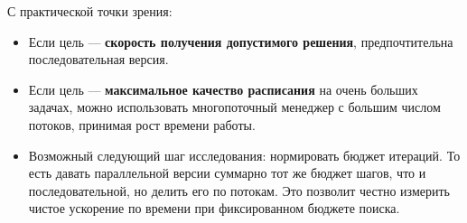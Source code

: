 \documentclass[a4paper,12pt]{article}
\begin{document}
С практической точки зрения:
\begin{itemize}
    \item Если цель --- \textbf{скорость получения допустимого решения}, предпочтительна последовательная версия.
    \item Если цель --- \textbf{максимальное качество расписания} на очень больших задачах, можно использовать многопоточный менеджер с большим числом потоков, принимая рост времени работы.
    \item Возможный следующий шаг исследования: нормировать бюджет итераций. То есть давать параллельной версии суммарно тот же бюджет шагов, что и последовательной, но делить его по потокам. Это позволит честно измерить чистое ускорение по времени при фиксированном бюджете поиска.
\end{itemize}
\end{document}
